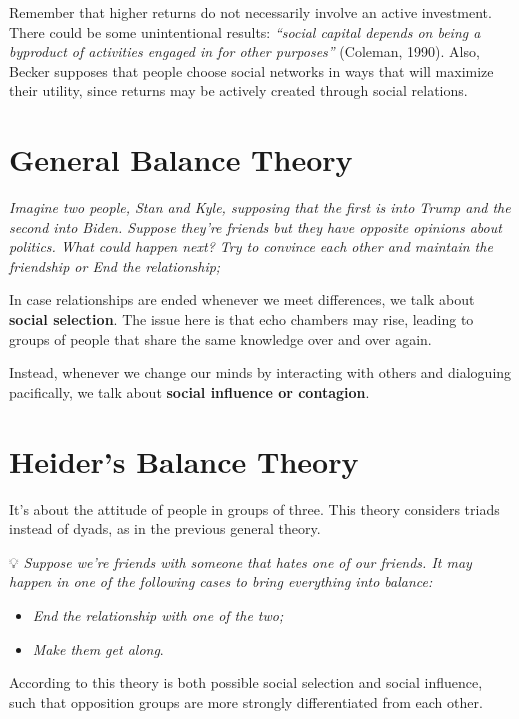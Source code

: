 \documentclass[
  notitlepage,
  onecolumn,
  openany]{book}
\providecommand{\tightlist}{%
  \setlength{\itemsep}{0pt}\setlength{\parskip}{0pt}}
\begin{document}
Remember that higher returns do not necessarily involve an active
investment. There could be some unintentional results: \emph{``social capital
depends on being a byproduct of activities engaged in for other
purposes''} (Coleman, 1990). Also, Becker supposes that people choose
social networks in ways that will maximize their utility, since returns
may be actively created through social relations.

\hypertarget{general-balance-theory}{%
\section{General Balance Theory}\label{general-balance-theory}}

\emph{Imagine two people, Stan and Kyle, supposing that the first is into
Trump and the second into Biden. Suppose they're friends but they have
opposite opinions about politics. What could happen next? Try to
convince each other and maintain the friendship or End the
relationship;}

In case relationships are ended whenever we meet differences, we talk
about \textbf{social selection}. The issue here is that echo chambers may
rise, leading to groups of people that share the same knowledge over and
over again.

Instead, whenever we change our minds by interacting with others and
dialoguing pacifically, we talk about \textbf{social influence or contagion}.

\hypertarget{heiders-balance-theory}{%
\section{Heider's Balance Theory}\label{heiders-balance-theory}}

It's about the attitude of people in groups of three. This theory
considers triads instead of dyads, as in the previous general theory.

💡 \emph{Suppose we're friends with someone that hates one of our friends. It
may happen in one of the following cases to bring everything into
balance:}

\begin{itemize}
\tightlist
\item
  \emph{End the relationship with one of the two;}
\item
  \emph{Make them get along}.
\end{itemize}

According to this theory is both possible social selection and social
influence, such that opposition groups are more strongly differentiated
from each other.
\end{document}
